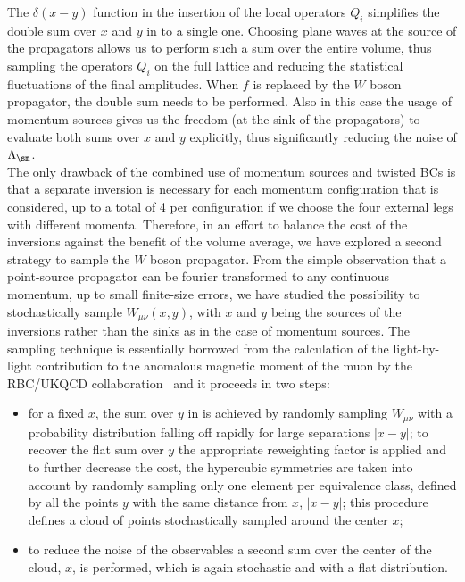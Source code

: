 \documentclass[aps,prd,twocolumn,nofootinbib,showpacs,superscriptaddress]{revtex4-1}
\begin{document}
The $\delta(x-y)$ function in the insertion of the local operators $Q_i$ 
simplifies the double sum over $x$ and $y$ in  to a single one. 
Choosing plane waves at the source of the propagators allows us to perform
such a sum over the entire volume, thus sampling the operators $Q_i$ 
on the full lattice and reducing the statistical fluctuations of the final amplitudes.
When $f$ is replaced by the $W$ boson propagator, the double sum needs to be 
performed. Also in this case the usage of momentum sources gives us the freedom 
(at the sink of the propagators) to evaluate both sums over $x$ and $y$ explicitly,
thus significantly reducing the noise of $\Lambda_\sm$.\\

The only drawback of the combined use of momentum sources and twisted BCs is that
a separate inversion is necessary for each momentum configuration that is considered,
up to a total of 4 per configuration if we choose the four external legs with different
momenta. Therefore, in an effort to balance the cost of the inversions against the benefit of the volume
average, we have explored a second strategy to sample the $W$ boson propagator.
From the simple observation that a point-source propagator can be fourier transformed to any
continuous momentum, up to small finite-size errors,
we have studied the possibility to stochastically sample $W_{\mu\nu}(x,y)$, 
with $x$ and $y$ being the sources of the inversions
rather than the sinks as in the case of momentum sources.
The sampling technique is essentially borrowed from the calculation of the light-by-light contribution to the anomalous
magnetic moment of the muon by the RBC/UKQCD collaboration~\cite{Blum:2015gfa} 
and it proceeds in two steps: 

\begin{itemize}
\item for a fixed $x$, the sum over $y$ in  is achieved by randomly sampling $W_{\mu \nu}$ 
with a probability distribution falling off rapidly for large separations $|x-y|$; to recover
the flat sum over $y$ the appropriate reweighting factor is applied and to further decrease the cost, 
the hypercubic symmetries are taken into account by randomly sampling only one element per equivalence
class, defined by all the points $y$ with the same distance from $x$, $|x-y|$; this procedure 
defines a cloud of points stochastically sampled around the center $x$;

\item to reduce the noise of the observables a second sum 
over the center of the cloud, $x$, is performed, 
which is again stochastic and with a flat distribution.

\end{itemize}
\end{document}

